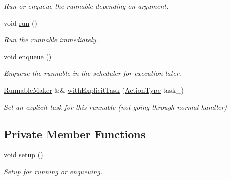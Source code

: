 \begin{DoxyCompactItemize}
\begin{DoxyCompactList}\small\item\em Run or enqueue the runnable depending on argument. \end{DoxyCompactList}\item 
void \hyperlink{structvt_1_1runnable_1_1_runnable_maker_a8fb3e1362dd6f746e991786654f5bd40}{run} ()
\begin{DoxyCompactList}\small\item\em Run the runnable immediately. \end{DoxyCompactList}\item 
void \hyperlink{structvt_1_1runnable_1_1_runnable_maker_a76516d824c744bdd347806012a78e19b}{enqueue} ()
\begin{DoxyCompactList}\small\item\em Enqueue the runnable in the scheduler for execution later. \end{DoxyCompactList}\item 
\hyperlink{structvt_1_1runnable_1_1_runnable_maker}{Runnable\+Maker} \&\& \hyperlink{structvt_1_1runnable_1_1_runnable_maker_abe4aca5620c53dc9e035c3a60fe8c76b}{with\+Explicit\+Task} (\hyperlink{namespacevt_ae0a5a7b18cc99d7b732cb4d44f46b0f3}{Action\+Type} task\+\_\+)
\begin{DoxyCompactList}\small\item\em Set an explicit task for this runnable (not going through normal handler) \end{DoxyCompactList}\end{DoxyCompactItemize}
\subsection*{Private Member Functions}
\begin{DoxyCompactItemize}
\item 
void \hyperlink{structvt_1_1runnable_1_1_runnable_maker_add114dad8a3f0769bed8b8396ba9a13a}{setup} ()
\begin{DoxyCompactList}\small\item\em Setup for running or enqueuing. \end{DoxyCompactList}\end{DoxyCompactItemize}
